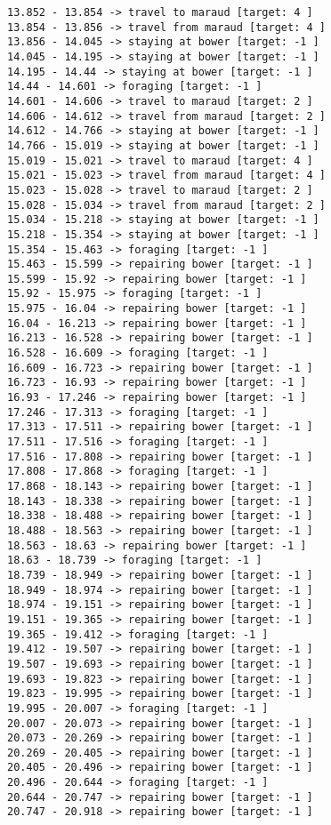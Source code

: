 \documentclass[11pt]{article}
\begin{document}
\begin{Verbatim}[commandchars=\\\{\}]
13.852 - 13.854 -> travel to maraud [target: 4 ]
13.854 - 13.856 -> travel from maraud [target: 4 ]
13.856 - 14.045 -> staying at bower [target: -1 ]
14.045 - 14.195 -> staying at bower [target: -1 ]
14.195 - 14.44 -> staying at bower [target: -1 ]
14.44 - 14.601 -> foraging [target: -1 ]
14.601 - 14.606 -> travel to maraud [target: 2 ]
14.606 - 14.612 -> travel from maraud [target: 2 ]
14.612 - 14.766 -> staying at bower [target: -1 ]
14.766 - 15.019 -> staying at bower [target: -1 ]
15.019 - 15.021 -> travel to maraud [target: 4 ]
15.021 - 15.023 -> travel from maraud [target: 4 ]
15.023 - 15.028 -> travel to maraud [target: 2 ]
15.028 - 15.034 -> travel from maraud [target: 2 ]
15.034 - 15.218 -> staying at bower [target: -1 ]
15.218 - 15.354 -> staying at bower [target: -1 ]
15.354 - 15.463 -> foraging [target: -1 ]
15.463 - 15.599 -> repairing bower [target: -1 ]
15.599 - 15.92 -> repairing bower [target: -1 ]
15.92 - 15.975 -> foraging [target: -1 ]
15.975 - 16.04 -> repairing bower [target: -1 ]
16.04 - 16.213 -> repairing bower [target: -1 ]
16.213 - 16.528 -> repairing bower [target: -1 ]
16.528 - 16.609 -> foraging [target: -1 ]
16.609 - 16.723 -> repairing bower [target: -1 ]
16.723 - 16.93 -> repairing bower [target: -1 ]
16.93 - 17.246 -> repairing bower [target: -1 ]
17.246 - 17.313 -> foraging [target: -1 ]
17.313 - 17.511 -> repairing bower [target: -1 ]
17.511 - 17.516 -> foraging [target: -1 ]
17.516 - 17.808 -> repairing bower [target: -1 ]
17.808 - 17.868 -> foraging [target: -1 ]
17.868 - 18.143 -> repairing bower [target: -1 ]
18.143 - 18.338 -> repairing bower [target: -1 ]
18.338 - 18.488 -> repairing bower [target: -1 ]
18.488 - 18.563 -> repairing bower [target: -1 ]
18.563 - 18.63 -> repairing bower [target: -1 ]
18.63 - 18.739 -> foraging [target: -1 ]
18.739 - 18.949 -> repairing bower [target: -1 ]
18.949 - 18.974 -> repairing bower [target: -1 ]
18.974 - 19.151 -> repairing bower [target: -1 ]
19.151 - 19.365 -> repairing bower [target: -1 ]
19.365 - 19.412 -> foraging [target: -1 ]
19.412 - 19.507 -> repairing bower [target: -1 ]
19.507 - 19.693 -> repairing bower [target: -1 ]
19.693 - 19.823 -> repairing bower [target: -1 ]
19.823 - 19.995 -> repairing bower [target: -1 ]
19.995 - 20.007 -> foraging [target: -1 ]
20.007 - 20.073 -> repairing bower [target: -1 ]
20.073 - 20.269 -> repairing bower [target: -1 ]
20.269 - 20.405 -> repairing bower [target: -1 ]
20.405 - 20.496 -> repairing bower [target: -1 ]
20.496 - 20.644 -> foraging [target: -1 ]
20.644 - 20.747 -> repairing bower [target: -1 ]
20.747 - 20.918 -> repairing bower [target: -1 ]

\end{Verbatim}
\end{document}
